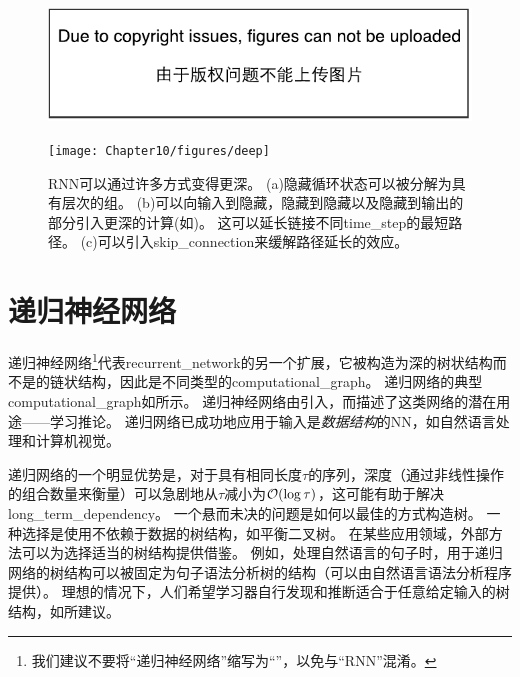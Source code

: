 
\begin{figure}[!htb]
\ifOpenSource
\centerline{\includegraphics{figure.pdf}}
\else
\centerline{\texttt{[image: Chapter10/figures/deep]}}
\fi
\caption{\gls{RNN}可以通过许多方式变得更深\citep{Pascanu-et-al-ICLR2014}。
(a)隐藏循环状态可以被分解为具有层次的组。
(b)可以向输入到隐藏，隐藏到隐藏以及隐藏到输出的部分引入更深的计算(如)。
这可以延长链接不同\gls{time_step}的最短路径。
(c)可以引入\gls{skip_connection}来缓解路径延长的效应。
}
\label{fig:chap10_deep}
\end{figure}

\section{递归神经网络}
\label{sec:recursive_neural_networks}
递归神经网络\footnote{我们建议不要将``递归神经网络''缩写为``''，以免与``\gls{RNN}''混淆。}代表\gls{recurrent_network}的另一个扩展，它被构造为深的树状结构而不是的链状结构，因此是不同类型的\gls{computational_graph}。
递归网络的典型\gls{computational_graph}如所示。
递归神经网络由\cite{Pollack90}引入，而\cite{tr-bottou-2011}描述了这类网络的潜在用途——学习推论。
递归网络已成功地应用于输入是\emph{数据结构}的\gls{NN}\citep{Frasconi97,Frasconi-1998}，如自然语言处理\citep{Socher+al-NIPS2011,Socher+al-EMNLP2011-small,Socher-et-al-EMNLP2013}和计算机视觉\citep{Socher-2011}。


递归网络的一个明显优势是，对于具有相同长度$\tau$的序列，深度（通过非线性操作的组合数量来衡量）可以急剧地从$\tau$减小为$\mathcal{O}(\log \tau)$，这可能有助于解决\gls{long_term_dependency}。
一个悬而未决的问题是如何以最佳的方式构造树。
一种选择是使用不依赖于数据的树结构，如平衡二叉树。
在某些应用领域，外部方法可以为选择适当的树结构提供借鉴。
例如，处理自然语言的句子时，用于递归网络的树结构可以被固定为句子语法分析树的结构（可以由自然语言语法分析程序提供）\citep{Socher+al-NIPS2011,Socher+al-EMNLP2011-small}。
理想的情况下，人们希望学习器自行发现和推断适合于任意给定输入的树结构，如\citep{tr-bottou-2011}所建议。

